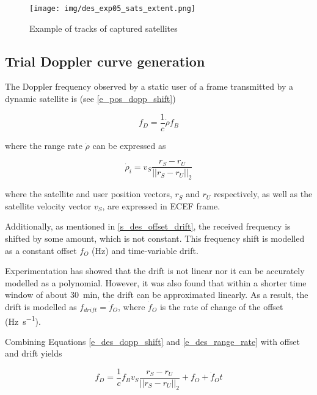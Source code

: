 \begin{figure}
    \centering
    \texttt{[image: img/des\_exp05\_sats\_extent.png]}
    \caption{Example of tracks of captured satellites}
    \label{f_des_exp05_sats_extent}
\end{figure}


\subsection{Trial Doppler curve generation}
The Doppler frequency observed by a static user of a frame transmitted by a dynamic satellite  is (see \autoref{e_pos_dopp_shift})

\begin{equation}
    \label{e_des_dopp_shift}
    f_D = \frac{1}{c}\dot\rho f_B
\end{equation}

where the range rate $\dot\rho$ can be expressed as

\begin{equation}
    \label{e_des_range_rate}
    \dot\rho_i = v_S \frac{r_S - r_U}{||r_S - r_U||_2}
\end{equation}

where the satellite and user position vectors, $r_S$ and $r_U$ respectively, as well as the satellite velocity vector $v_S$, are expressed in ECEF frame.

Additionally, as mentioned in \autoref{s_des_offset_drift}, the received frequency is shifted by some amount, which is not constant. This frequency shift is modelled as a constant offset $f_O$ (Hz) and time-variable drift.

Experimentation has showed that the drift is not linear nor it can be accurately modelled as a polynomial. However, it was also found that within a shorter time window of about \qty{30}{min},
the drift can be approximated linearly. As a result, the drift is modelled as $f_{drift} = \dot f_O$, where $\dot f_O$ is the rate of change of the offset (\unit{\hertz\per\s}).

Combining Equations \ref{e_des_dopp_shift} and \ref{e_des_range_rate} with offset and drift yields

\begin{equation}
    \label{e_des_dopp_curve}
    f_D = \frac{1}{c} f_B v_S \frac{r_S - r_U}{||r_S - r_U||_2} + f_O + \dot f_O t
\end{equation}


